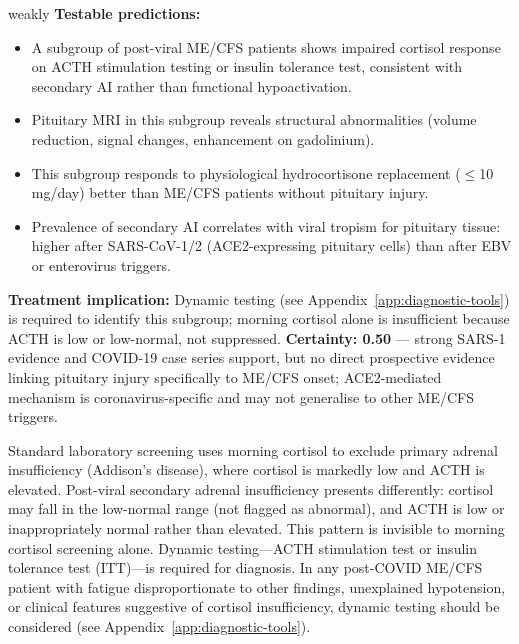 \begin{fhypothesis}{weakly}
\textbf{Testable predictions:}
\begin{itemize}
    \item[(a)] A subgroup of post-viral ME/CFS patients shows impaired cortisol response on ACTH stimulation testing or insulin tolerance test, consistent with secondary AI rather than functional hypoactivation.
    \item[(b)] Pituitary MRI in this subgroup reveals structural abnormalities (volume reduction, signal changes, enhancement on gadolinium).
    \item[(c)] This subgroup responds to physiological hydrocortisone replacement ($\leq$10\,mg/day) better than ME/CFS patients without pituitary injury.
    \item[(d)] Prevalence of secondary AI correlates with viral tropism for pituitary tissue: higher after SARS-CoV-1/2 (ACE2-expressing pituitary cells) than after EBV or enterovirus triggers.
\end{itemize}
\textbf{Treatment implication:} Dynamic testing (see Appendix~\ref{app:diagnostic-tools}) is required to identify this subgroup; morning cortisol alone is insufficient because ACTH is low or low-normal, not suppressed.
\textbf{Certainty: 0.50} --- strong SARS-1 evidence and COVID-19 case series support, but no direct prospective evidence linking pituitary injury specifically to ME/CFS onset; ACE2-mediated mechanism is coronavirus-specific and may not generalise to other ME/CFS triggers.
\end{fhypothesis}

\begin{warning}
\label{warn:secondary-ai-testing}
Standard laboratory screening uses morning cortisol to exclude primary adrenal insufficiency (Addison's disease), where cortisol is markedly low and ACTH is elevated. Post-viral secondary adrenal insufficiency presents differently: cortisol may fall in the low-normal range (not flagged as abnormal), and ACTH is low or inappropriately normal rather than elevated. This pattern is invisible to morning cortisol screening alone. Dynamic testing---ACTH stimulation test or insulin tolerance test (ITT)---is required for diagnosis. In any post-COVID ME/CFS patient with fatigue disproportionate to other findings, unexplained hypotension, or clinical features suggestive of cortisol insufficiency, dynamic testing should be considered (see Appendix~\ref{app:diagnostic-tools}).
\end{warning}


